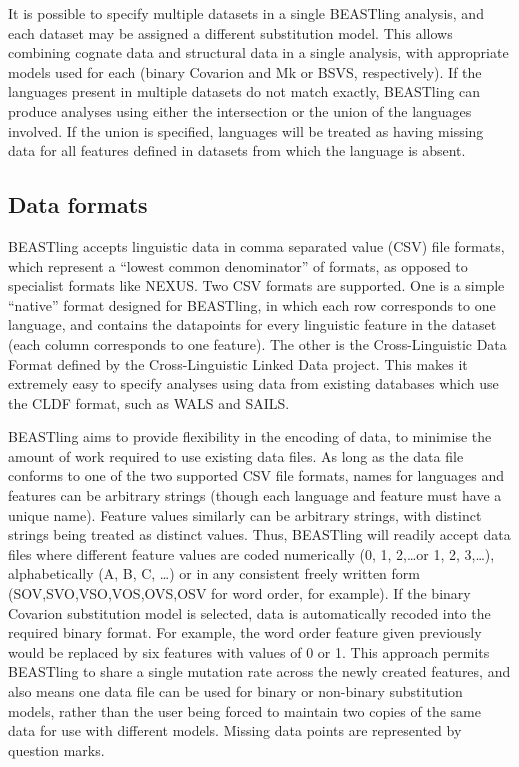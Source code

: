 \documentclass[twocolumn,10pt]{scrartcl}
\begin{document}
It is possible to specify multiple datasets in a single BEASTling analysis, and each dataset may be assigned a different substitution model.  This allows combining cognate data and structural data in a single analysis, with appropriate models used for each (binary Covarion and Mk or BSVS, respectively).  If the languages present in multiple datasets do not match exactly, BEASTling can produce analyses using either the intersection or the union of the languages involved.  If the union is specified, languages will be treated as having missing data for all features defined in datasets from which the language is absent.

\subsection{Data formats}

BEASTling accepts linguistic data in comma separated value (CSV) file formats, which represent a ``lowest common denominator'' of formats, as opposed to specialist formats like NEXUS.  Two CSV formats are supported.  One is a simple ``native'' format designed for BEASTling, in which each row corresponds to one language, and contains the datapoints for every linguistic feature in the dataset (each column corresponds to one feature).  The other is the Cross-Linguistic Data Format defined by the Cross-Linguistic Linked Data project.  This makes it extremely easy to specify analyses using data from existing databases which use the CLDF format, such as WALS and SAILS.

BEASTling aims to provide flexibility in the encoding of data, to minimise the amount of work required to use existing data files.  As long as the data file conforms to one of the two supported CSV file formats, names for languages and features can be arbitrary strings (though each language and feature must have a unique name).  Feature values similarly can be arbitrary strings, with distinct strings being treated as distinct values.  Thus, BEASTling will readily accept data files where different feature values are coded numerically (0, 1, 2,\ldots or 1, 2, 3,\ldots), alphabetically (A, B, C, \ldots) or in any consistent freely written form (SOV,SVO,VSO,VOS,OVS,OSV for word order, for example).  If the binary Covarion substitution model is selected, data is automatically recoded into the required binary format.  For example, the word order feature given previously would be replaced by six features with values of 0 or 1.  This approach permits BEASTling to share a single mutation rate across the newly created features, and also means one data file can be used for binary or non-binary substitution models, rather than the user being forced to maintain two copies of the same data for use with different models.  Missing data points are represented by question marks.
\end{document}
